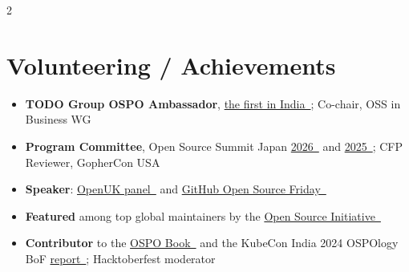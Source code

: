 \documentclass[letterpaper,11pt]{article}
\begin{document}
\begin{center}
\begin{paracol}{2}
		\section{Volunteering / Achievements}
		\vspace{3pt}
		\begin{itemize}[leftmargin=0.15in, itemsep=3pt, topsep=1pt, parsep=0pt]
			\item \textbf{TODO Group OSPO Ambassador}, \href{https://todogroup.org/blog/2026-08-31-ambassador-swastik/}{the first in India~\faLink}; Co-chair, OSS in Business WG
			\item \textbf{Program Committee}, Open Source Summit Japan \href{https://www.credly.com/badges/c743ea5c-11a6-4338-adcd-9bc48cc2e54a/public_url}{2026~\faLink} and \href{https://www.credly.com/badges/96656df7-6491-442c-a1ba-19d91db0642b/public_url}{2025~\faLink}; CFP Reviewer, GopherCon USA
			\item \textbf{Speaker}: \href{https://openuk.uk/event-calendar/ai-openness-and-access-for-all-delhi/}{OpenUK panel~\faLink} and \href{https://www.youtube.com/watch?v=gs8FFp0rAbk}{GitHub Open Source Friday~\faLink}
			\item \textbf{Featured} among top global maintainers by the \href{https://opensource.org/maintainers/delta456}{Open Source Initiative~\faLink}
			\item \textbf{Contributor} to the \href{https://todogroup.org/resources/book/}{OSPO Book~\faLink} and the KubeCon India 2024 OSPOlogy BoF \href{https://github.com/todogroup/ospology/blob/main/BoF/India2024_Report/Report.pdf}{report~\faLink}; Hacktoberfest moderator
		\end{itemize}
		

		
	\end{paracol}
	
\end{center}

\end{document}
